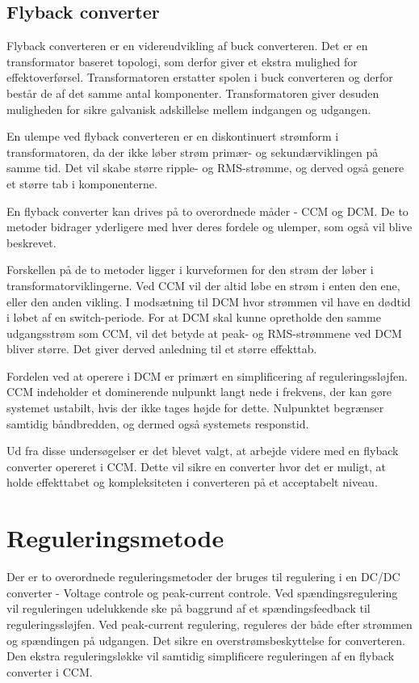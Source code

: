 \subsection{Flyback converter}
Flyback converteren er en videreudvikling af buck converteren. Det er en transformator baseret topologi, som derfor giver et ekstra mulighed for effektoverførsel. Transformatoren erstatter spolen i buck converteren og derfor består de af det samme antal komponenter. Transformatoren giver desuden muligheden for sikre galvanisk adskillelse mellem indgangen og udgangen. 

En ulempe ved flyback converteren er en diskontinuert strømform i transformatoren, da der ikke løber strøm primær- og sekundærviklingen på samme tid. Det vil skabe større ripple- og RMS-strømme, og derved også genere et større tab i komponenterne\cite{SMPS-topologies}. 

En flyback converter kan drives på to overordnede måder - CCM og DCM. De to metoder bidrager yderligere med hver deres fordele og ulemper, som også vil blive beskrevet. 

Forskellen på de to metoder ligger i kurveformen for den strøm der løber i transformatorviklingerne. Ved CCM vil der altid løbe en strøm i enten den ene, eller den anden vikling. I modsætning til DCM hvor strømmen vil have en dødtid i løbet af en switch-periode. For at DCM skal kunne opretholde den samme udgangsstrøm som CCM, vil det betyde at peak- og RMS-strømmene ved DCM bliver større. Det giver derved anledning til et større effekttab. 

Fordelen ved at operere i DCM er primært en simplificering af reguleringssløjfen. CCM indeholder et dominerende nulpunkt langt nede i frekvens, der kan gøre systemet ustabilt, hvis der ikke tages højde for dette. Nulpunktet begrænser samtidig båndbredden, og dermed også systemets responstid. 

Ud fra disse undersøgelser er det blevet valgt, at arbejde videre med en flyback converter opereret i CCM. Dette vil sikre en converter hvor det er muligt, at holde effekttabet og kompleksiteten i converteren på et acceptabelt niveau. 

\section{Reguleringsmetode}
Der er to overordnede reguleringsmetoder der bruges til regulering i en DC/DC converter - Voltage controle og peak-current controle. Ved spændingsregulering vil reguleringen udelukkende ske på baggrund af et spændingsfeedback til reguleringssløjfen. Ved peak-current regulering, reguleres der både efter strømmen og spændingen på udgangen. Det sikre en overstrømsbeskyttelse for converteren. Den ekstra reguleringsløkke vil samtidig simplificere reguleringen af en flyback converter i CCM. 

